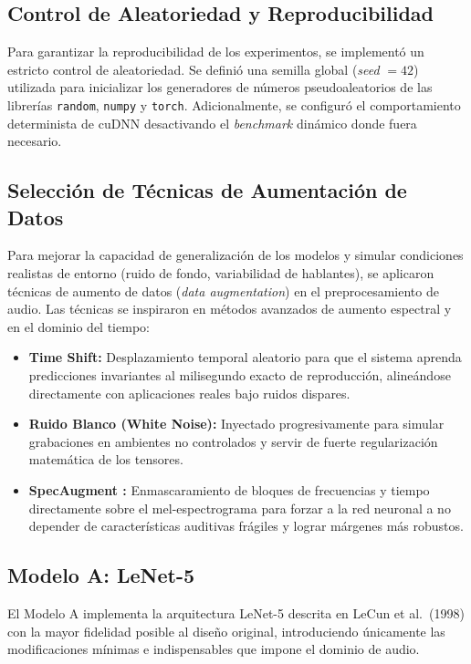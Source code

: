 \documentclass[conference]{IEEEtran}
\begin{document}
\subsection{Control de Aleatoriedad y Reproducibilidad}
Para garantizar la reproducibilidad de los experimentos, se implementó un estricto control de aleatoriedad. Se definió una semilla global (\textit{seed} $= 42$) utilizada para inicializar los generadores de números pseudoaleatorios de las librerías \texttt{random}, \texttt{numpy} y \texttt{torch}. Adicionalmente, se configuró el comportamiento determinista de cuDNN desactivando el \textit{benchmark} dinámico donde fuera necesario.

\subsection{Selección de Técnicas de Aumentación de Datos}
Para mejorar la capacidad de generalización de los modelos y simular condiciones realistas de entorno (ruido de fondo, variabilidad de hablantes), se aplicaron técnicas de aumento de datos (\textit{data augmentation}) en el preprocesamiento de audio. Las técnicas se inspiraron en métodos avanzados de aumento espectral y en el dominio del tiempo:
\begin{itemize}
    \item \textbf{Time Shift:} Desplazamiento temporal aleatorio para que el sistema aprenda predicciones invariantes al milisegundo exacto de reproducción, alineándose directamente con aplicaciones reales bajo ruidos dispares.
    \item \textbf{Ruido Blanco (White Noise):} Inyectado progresivamente para simular grabaciones en ambientes no controlados y servir de fuerte regularización matemática de los tensores.
    \item \textbf{SpecAugment \cite{specaugment}:} Enmascaramiento de bloques de frecuencias y tiempo directamente sobre el mel-espectrograma para forzar a la red neuronal a no depender de características auditivas frágiles y lograr márgenes más robustos.
\end{itemize}

\subsection{Modelo A: LeNet-5}
El Modelo A implementa la arquitectura LeNet-5 descrita en LeCun et al.\ (1998) con
la mayor fidelidad posible al diseño original, introduciendo únicamente las
modificaciones mínimas e indispensables que impone el dominio de audio.
\end{document}
